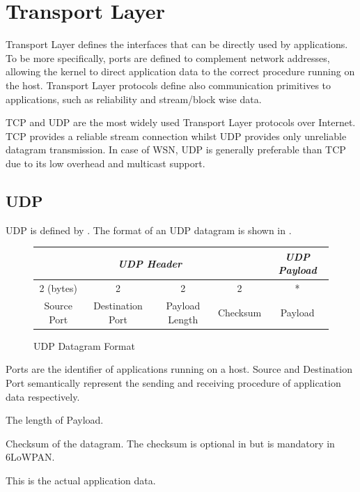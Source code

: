\section{Transport Layer} \label{Sec: Transport Layer}
Transport Layer defines the interfaces that can be directly used by applications. To be more specifically, ports are defined to complement network addresses, allowing the kernel to direct application data to the correct procedure running on the host. Transport Layer protocols define also communication primitives to applications, such as reliability and stream/block wise data.

TCP and UDP are the most widely used Transport Layer protocols over Internet. TCP provides a reliable stream connection whilst UDP provides only unreliable datagram transmission. In case of WSN, UDP is generally preferable than TCP due to its low overhead and multicast support.

\subsection{UDP} \label{Subsec: UDP}

UDP is defined by \cite{rfc768}. The format of an UDP datagram is shown in .

\begin{figure}[th!]
	\center
	\begin{tabular}{ccccc}
		\multicolumn{4}{c}{\textit{UDP Header}}                                                                                                                & \textit{UDP Payload}         \\ \hline
		\multicolumn{1}{|c|}{2 (bytes)} & \multicolumn{1}{c|}{2}                & \multicolumn{1}{c|}{2}              & \multicolumn{1}{c|}{2}        & \multicolumn{1}{c|}{*}       \\ \hline
		\multicolumn{1}{|c|}{Source Port}        & \multicolumn{1}{c|}{Destination Port} & \multicolumn{1}{c|}{Payload Length} & \multicolumn{1}{c|}{Checksum} & \multicolumn{1}{c|}{Payload} \\ \hline
	\end{tabular}
	\caption{UDP Datagram Format}
	\label{Fig: UDP Datagram Format}
\end{figure}

\begin{description}[style=nextline]
	\item[\textbf{Source and Destination Port}]
	Ports are the identifier of applications running on a host. Source and Destination Port semantically represent the sending and receiving procedure of application data respectively.
	\item[\textbf{Payload Length}]
	The length of Payload.
	\item[\textbf{Checksum}]
	Checksum of the datagram. The checksum is optional in \cite{rfc768} but is mandatory in 6LoWPAN.
	\item[\textbf{Payload}]
	This is the actual application data.
\end{description}

